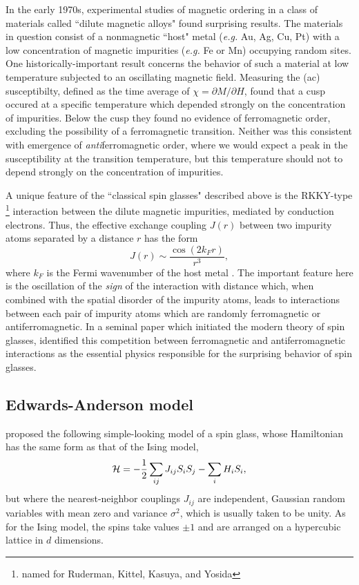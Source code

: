 In the early 1970s, experimental studies of magnetic ordering in a class of
materials called ``dilute magnetic alloys" found surprising results. The
materials in question consist of a nonmagnetic ``host" metal (\textit{e.g.} Au,
Ag, Cu, Pt) with a low concentration of magnetic impurities (\textit{e.g.} Fe
or Mn) occupying random sites. One historically-important result concerns the
behavior of such a material at low temperature subjected to an oscillating
magnetic field. Measuring the (ac) susceptibilty, defined as the time average
of $\chi = \partial M / \partial H$, \textcite{cannella1972magnetic} found that
a cusp occured at a specific temperature which depended strongly on the
concentration of impurities. Below the cusp they found no evidence of
ferromagnetic order, excluding the possibility of a ferromagnetic transition.
Neither was this consistent with emergence of \emph{anti}ferromagnetic order,
where we would expect a peak in the susceptibility at the transition
temperature, but this temperature should not to depend strongly on the
concentration of impurities.

A unique feature of the ``classical spin glasses" described above is the
RKKY-type%
\footnote{%
  named for Ruderman, Kittel, Kasuya, and Yosida
}
interaction between the dilute magnetic impurities, mediated by conduction
electrons. Thus, the effective exchange coupling $J(r)$ between two impurity
atoms separated by a distance $r$ has the form
\begin{equation}
  J(r) \sim \frac{\cos(2 k_F r)}{r^3},
\end{equation}
where $k_F$ is the Fermi wavenumber of the host metal
\autocite{binder1986spin}. The important feature here is the oscillation of the
\emph{sign} of the interaction with distance which, when combined with the
spatial disorder of the impurity atoms, leads to interactions between each pair
of impurity atoms which are randomly ferromagnetic or antiferromagnetic. In a
seminal paper which initiated the modern theory of spin glasses,
\textcite{edwards1975theory} identified this competition between ferromagnetic
and antiferromagnetic interactions as the essential physics responsible for the
surprising behavior of spin glasses.


\subsection{Edwards-Anderson model}
\label{sec:intro-ea}

\textcite{edwards1975theory} proposed the following simple-looking model of a
spin glass, whose Hamiltonian has the same form as that of the Ising model,
\begin{equation}
  \mathcal{H} = -\frac{1}{2} \sum_{ij} J_{ij} S_i S_j - \sum_i H_i S_i,
\end{equation}
but where the nearest-neighbor couplings $J_{ij}$ are independent, Gaussian
random variables with mean zero and variance $\sigma^2$, which is usually taken
to be unity. As for the Ising model, the spins take values $\pm 1$ and are
arranged on a hypercubic lattice in $d$ dimensions.

